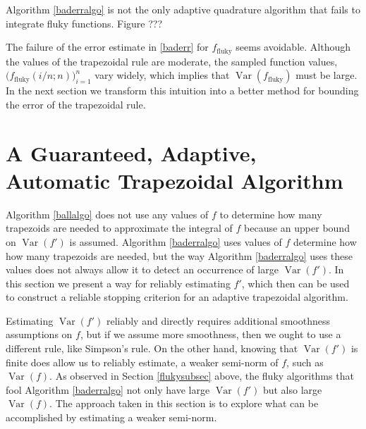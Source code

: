 \documentclass[]{article}
\DeclareMathOperator{\Var}{Var}
\theoremstyle{definition}
\theoremstyle{remark}
\begin{document}
Algorithm \ref{baderralgo} is not the only adaptive quadrature algorithm that fails to integrate fluky functions.  Figure ??? 

The failure of the error estimate in \eqref{baderr} for $f_{\text{fluky}}$ seems avoidable. Although the values of the trapezoidal rule are moderate, the sampled function values, $\bigl(f_{\text{fluky}}(i/n;n)\bigr)_{i=1}^{n}$ vary widely, which implies that $\Var(f_{\text{fluky}})$ must be large.  In the next section we transform this intuition into a better method for bounding the error of the trapezoidal rule.


\section{A Guaranteed, Adaptive, Automatic Trapezoidal Algorithm} \label{newalgosec}

Algorithm \ref{ballalgo} does not use any values of $f$ to determine how many trapezoids are needed to approximate the integral of $f$ because an upper bound on $\Var(f')$ is assumed.  Algorithm \ref{baderralgo} uses values of $f$ determine how how many trapezoids are needed, but the way Algorithm \ref{baderralgo} uses these values does not always allow it to detect an occurrence of large $\Var(f')$.  In this section we present a way for reliably estimating $f'$, which then can be used to construct a reliable stopping criterion for an adaptive trapezoidal algorithm.

Estimating $\Var(f')$ reliably and directly requires additional smoothness assumptions on $f$, but if we assume more smoothness, then we ought to use a different rule, like Simpson's rule.  On the other hand, knowing that $\Var(f')$ is finite does allow us to reliably estimate, a weaker semi-norm of $f$, such as $\Var(f)$.  As observed in Section \ref{flukysubsec} above, the fluky algorithms that fool Algorithm \ref{baderralgo} not only have large $\Var(f')$ but also large $\Var(f)$.  The approach taken in this section is to explore what can be accomplished by estimating a weaker semi-norm.
\end{document}
